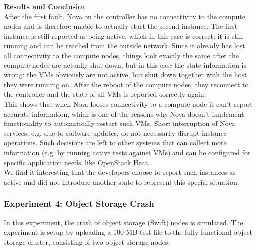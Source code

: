 \textbf{Results and Conclusion}\\
After the first fault,  Nova on the controller has no connectivity to the compute nodes and is therefore unable to actually start the second instance. The first instance is still reported as being active, which in this case is correct: it is still running and can be reached from the outside network. Since it already has lost all connectivity to the compute nodes, things look exactly the same after the compute nodes are actually shut down, but in this case the state information is wrong: the VMs obviously are not active, but shut down together with the host they were running on. After the reboot of the compute nodes, they reconnect to the controller and the state of all VMs is reported correctly again.\\

This shows that when Nova looses connectivity to a compute node it can't report accurate information, which is one of the reasons why Nova doesn't implement functionality to automatically restart such VMs.  Short interruption of Nova services, e.g. due to software updates, do not necessarily disrupt instance operations. Such decisions are left to other systems that can collect more information (e.g. by running active tests against VMs) and can be configured for specific application needs, like OpenStack Heat. \\

We find it interesting that the developers choose to report such instances as active and did not introduce another state to represent this special situation.

\subsubsection{Experiment 4: Object Storage Crash}
In this experiment, the crash of object storage (Swift) nodes is simulated. The experiment is setup by uploading a 100 MB test file to the fully functional object storage cluster, consisting of two object storage nodes. \\

